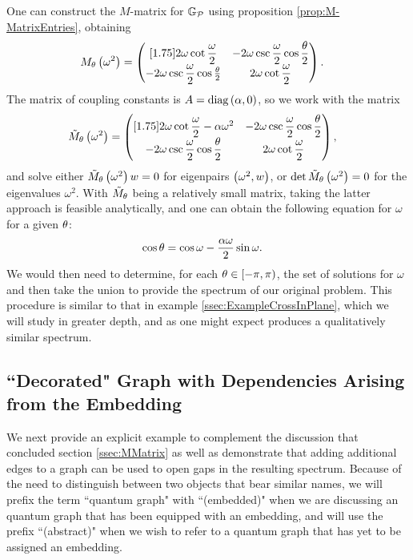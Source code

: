 One can construct the $M$-matrix for $\mathbb{G}_{\mathcal{P}}$ using proposition \ref{prop:M-MatrixEntries}, obtaining 
\begin{align*}
	M_{\theta}\left( \omega^2 \right) &= 
	\begin{pmatrix}[1.75]
		2\omega\cot\dfrac{\omega}{2} & -2\omega\csc\dfrac{\omega}{2}\cos\dfrac{\theta}{2} \\
		-2\omega\csc\dfrac{\omega}{2}\cos\frac{\theta}{2} & 2\omega\cot\dfrac{\omega}{2}
	\end{pmatrix}.
\end{align*}
The matrix of coupling constants is $A = \mathrm{diag}\left( \alpha, 0 \right)$, so we work with the matrix
\begin{align*}
	\tilde{M}_\theta\left( \omega^2 \right) &= 
	\begin{pmatrix}[1.75]
		2\omega\cot\dfrac{\omega}{2} - \alpha\omega^2 & -2\omega\csc\dfrac{\omega}{2}\cos\dfrac{\theta}{2} \\
		-2\omega\csc\dfrac{\omega}{2}\cos\dfrac{\theta}{2} & 2\omega\cot\dfrac{\omega}{2}		
	\end{pmatrix},
\end{align*}
and solve either $\tilde{M}_\theta\left( \omega^2 \right) w = 0$ for eigenpairs $\left( \omega^2, w \right)$, or $\det\tilde{M}_\theta \left( \omega^2 \right) = 0$ for the eigenvalues $\omega^2$.
With $\tilde{M}_\theta$ being a relatively small matrix, taking the latter approach is feasible analytically, and one can obtain the following equation for $\omega$ for a given $\theta$:
\begin{align*}
	\cos\theta &= \cos\omega - \frac{\alpha\omega}{2}\sin\omega.
\end{align*}
We would then need to determine, for each $\theta\in\left[-\pi, \pi\right)$, the set of solutions for $\omega$ and then take the union to provide the spectrum of our original problem.
This procedure is similar to that in example \ref{ssec:ExampleCrossInPlane}, which we will study in greater depth, and as one might expect produces a qualitatively similar spectrum.

\subsection{``Decorated" Graph with Dependencies Arising from the Embedding} \label{ssec:EmbeddingDependentExample}
We next provide an explicit example to complement the discussion that concluded section \ref{ssec:MMatrix} as well as demonstrate that adding additional edges to a graph can be used to open gaps in the resulting spectrum.
Because of the need to distinguish between two objects that bear similar names, we will prefix the term ``quantum graph" with ``(embedded)" when we are discussing an quantum graph that has been equipped with an embedding, and will use the prefix ``(abstract)" when we wish to refer to a quantum graph that has yet to be assigned an embedding.

